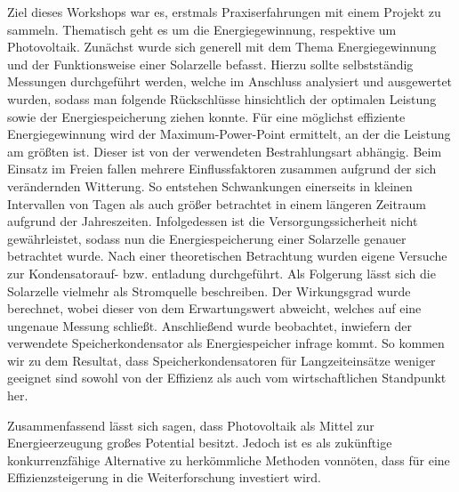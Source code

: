 \par Ziel dieses Workshops war es, erstmals Praxiserfahrungen mit einem Projekt zu sammeln. Thematisch geht es um die Energiegewinnung, respektive um Photovoltaik. Zunächst wurde sich generell mit dem Thema Energiegewinnung und der Funktionsweise einer Solarzelle befasst. Hierzu sollte selbstständig Messungen durchgeführt werden, welche im Anschluss analysiert und ausgewertet wurden, sodass man folgende Rückschlüsse hinsichtlich der optimalen Leistung sowie der Energiespeicherung ziehen konnte. Für eine möglichst effiziente Energiegewinnung wird der Maximum-Power-Point ermittelt, an der die Leistung am größten ist. Dieser ist von der verwendeten Bestrahlungsart abhängig. Beim Einsatz im Freien fallen mehrere Einflussfaktoren zusammen aufgrund der sich verändernden Witterung. So entstehen Schwankungen einerseits in kleinen Intervallen von Tagen als auch größer betrachtet in einem längeren Zeitraum aufgrund der Jahreszeiten. Infolgedessen ist die Versorgungssicherheit nicht gewährleistet, sodass nun die Energiespeicherung einer Solarzelle genauer betrachtet wurde. Nach einer theoretischen Betrachtung wurden eigene Versuche zur Kondensatorauf- bzw. entladung durchgeführt. Als Folgerung lässt sich die Solarzelle vielmehr als Stromquelle beschreiben. Der Wirkungsgrad wurde berechnet, wobei dieser von dem Erwartungswert abweicht, welches auf eine ungenaue Messung schließt. Anschließend wurde beobachtet, inwiefern der verwendete Speicherkondensator als Energiespeicher infrage kommt. So kommen wir zu dem Resultat, dass Speicherkondensatoren für Langzeiteinsätze weniger geeignet sind sowohl von der Effizienz als auch vom wirtschaftlichen Standpunkt her.

\par Zusammenfassend lässt sich sagen, dass Photovoltaik als Mittel zur Energieerzeugung großes
Potential besitzt. Jedoch ist es als zukünftige konkurrenzfähige Alternative zu herkömmliche
Methoden vonnöten, dass für eine Effizienzsteigerung in die Weiterforschung investiert wird.
